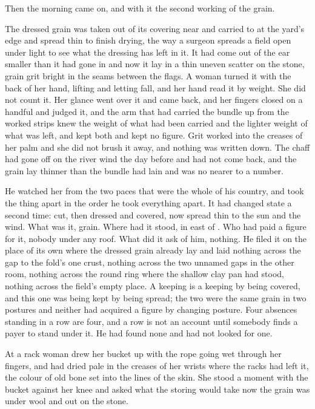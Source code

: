 Then the morning came on, and with it the second working of the grain.

The dressed grain was taken out of its covering near  and carried to  at the yard's edge and spread thin to finish drying, the way a surgeon spreads a field open under light to see what the dressing has left in it. It had come out of the ear smaller than it had gone in and now it lay in a thin uneven scatter on the stone, grain grit bright in the seams between the flags. A woman turned it with the back of her hand, lifting and letting fall, and her hand read it by weight. She did not count it. Her glance went over it and came back, and her fingers closed on a handful and judged it, and the arm that had carried the bundle up from the worked strips knew the weight of what had been carried and the lighter weight of what was left, and kept both and kept no figure. Grit worked into the creases of her palm and she did not brush it away, and nothing was written down. The chaff had gone off on the river wind the day before and had not come back, and the grain lay thinner than the bundle had lain and was no nearer to a number.

He watched her from the two paces that were the whole of his country, and took the thing apart in the order he took everything apart. It had changed state a second time: cut, then dressed and covered, now spread thin to the sun and the wind. What was it, grain. Where had it stood, in  east of . Who had paid a figure for it, nobody under any roof. What did it ask of him, nothing. He filed it on the place of its own where the dressed grain already lay and laid nothing across the gap to the fold's one crust, nothing across the two unnamed gaps in the other room, nothing across the round ring where the shallow clay pan had stood, nothing across the field's empty place. A keeping is a keeping by being covered, and this one was being kept by being spread; the two were the same grain in two postures and neither had acquired a figure by changing posture. Four absences standing in a row are four, and a row is not an account until somebody finds a payer to stand under it. He had found none and had not looked for one.

\scenebreak

At  a rack woman drew her bucket up with the rope going wet through her fingers, and  had dried pale in the creases of her wrists where the racks had left it, the colour of old bone set into the lines of the skin. She stood a moment with the bucket against her knee and asked  what the storing would take now the grain was under wool and out on the stone.

